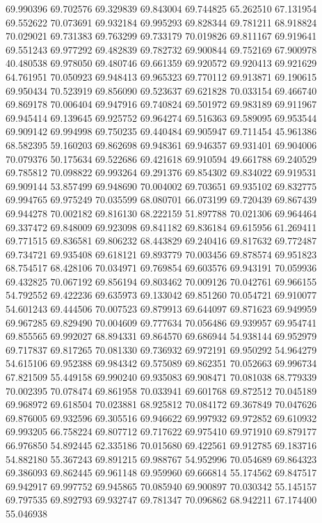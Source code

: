 69.990396
69.702576
69.329839
69.843004
69.744825
65.262510
67.131954
69.552622
70.073691
69.932184
69.995293
69.828344
69.781211
68.918824
70.029021
69.731383
69.763299
69.733179
70.019826
69.811167
69.919641
69.551243
69.977292
69.482839
69.782732
69.900844
69.752169
67.900978
40.480538
69.978050
69.480746
69.661359
69.920572
69.920413
69.921629
64.761951
70.050923
69.948413
69.965323
69.770112
69.913871
69.190615
69.950434
70.523919
69.856090
69.523637
69.621828
70.033154
69.466740
69.869178
70.006404
69.947916
69.740824
69.501972
69.983189
69.911967
69.945414
69.139645
69.925752
69.964274
69.516363
69.589095
69.953544
69.909142
69.994998
69.750235
69.440484
69.905947
69.711454
45.961386
68.582395
59.160203
69.862698
69.948361
69.946357
69.931401
69.904006
70.079376
50.175634
69.522686
69.421618
69.910594
49.661788
69.240529
69.785812
70.098822
69.993264
69.291376
69.854302
69.834022
69.919531
69.909144
53.857499
69.948690
70.004002
69.703651
69.935102
69.832775
69.994765
69.975249
70.035599
68.080701
66.073199
69.720439
69.867439
69.944278
70.002182
69.816130
68.222159
51.897788
70.021306
69.964464
69.337472
69.848009
69.923098
69.841182
69.836184
69.615956
61.269411
69.771515
69.836581
69.806232
68.443829
69.240416
69.817632
69.772487
69.734721
69.935408
69.618121
69.893779
70.003456
69.878574
69.951823
68.754517
68.428106
70.034971
69.769854
69.603576
69.943191
70.059936
69.432825
70.067192
69.856194
69.803462
70.009126
70.042761
69.966155
54.792552
69.422236
69.635973
69.133042
69.851260
70.054721
69.910077
54.601243
69.444506
70.007523
69.879913
69.644097
69.871623
69.949959
69.967285
69.829490
70.004609
69.777634
70.056486
69.939957
69.954741
69.855565
69.992027
68.894331
69.864570
69.686944
54.938144
69.952979
69.717837
69.817265
70.081330
69.736932
69.972191
69.950292
54.964279
54.615106
69.952388
69.984342
69.575089
69.862351
70.052663
69.996734
67.821509
55.449158
69.990240
69.935083
69.908471
70.081038
68.779339
70.002395
70.078474
69.861958
70.033941
69.601768
69.872512
70.045189
69.968972
69.618504
70.023881
68.925812
70.084172
69.367849
70.047626
69.876005
69.932596
69.305516
69.946622
69.997932
69.972852
69.610932
69.993205
66.758224
69.807712
69.717622
69.975410
69.971910
69.879177
66.976850
54.892445
62.335186
70.015680
69.422561
69.912785
69.183716
54.882180
55.367243
69.891215
69.988767
54.952996
70.054689
69.864323
69.386093
69.862445
69.961148
69.959960
69.666814
55.174562
69.847517
69.942917
69.997752
69.945865
70.085940
69.900897
70.030342
55.145157
69.797535
69.892793
69.932747
69.781347
70.096862
68.942211
67.174400
55.046938
